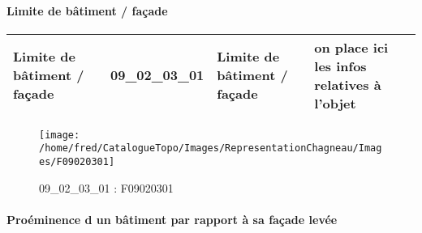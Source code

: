 \documentclass[12pt,titlepage,oneside]{book}
\begin{document}
\paragraph{Limite de bâtiment / façade}
\noindent
\vspace{\baselineskip}

\renewcommand{\arraystretch}{1.2}
\begin{supertabular}{|p{10cm}|c|p{13cm}|p{12cm}|}
 Limite de bâtiment / façade & 09\_02\_03\_01 & Limite de bâtiment / façade & on place ici les infos relatives à l'objet\\
\hline
\end{supertabular}
\begin{figure}[h!]
  \hfill         %
  \begin{minipage}[t]{3cm}
    \begin{center}
      \texttt{[image: /home/fred/CatalogueTopo/Images/RepresentationChagneau/Images/F09020301]}
      \caption[F09020301]{\label{} 09\_02\_03\_01 : F09020301}
    \end{center}
  \end{minipage}
\end{figure}


\paragraph{Proéminence d un bâtiment par rapport à sa façade levée}
\noindent
\vspace{\baselineskip}
\end{document}
